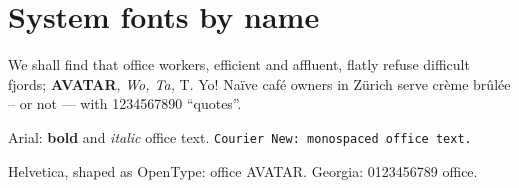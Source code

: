\documentclass{article}
\begin{document}
\section{System fonts by name}
We shall find that office workers, efficient and affluent, flatly refuse
difficult fjords; \textbf{AVATAR}, \emph{Wo, Ta,} T. Yo! Naïve café owners in
Zürich serve crème brûlée -- or not --- with 1234567890 ``quotes''.

\textsf{Arial: \textbf{bold} and \textit{italic} office text.}
\texttt{Courier New: monospaced office text.}

{\helvetica Helvetica, shaped as OpenType: office AVATAR.}
{\georgia Georgia: 0123456789 office.}
\end{document}
